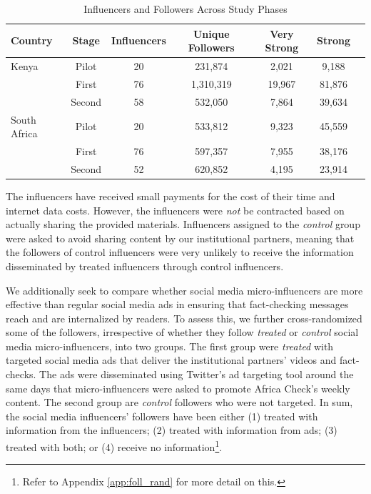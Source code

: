 \begin{table}[!htpb]
    \centering
     \caption{Influencers and Followers Across Study Phases}
    \label{tab:desc_stat}
    \begin{tabular}[t]{lcccccc}
\hline
\textbf{Country} & \textbf{Stage} & \textbf{Influencers} & \textbf{Unique Followers} & \textbf{Very Strong} & \textbf{Strong}\\
\hline
Kenya & Pilot & 20 & 231,874 & 2,021 & 9,188\\
 & First & 76 & 1,310,319 & 19,967 & 81,876 \\
 & Second & 58 & 532,050 & 7,864 & 39,634 \\
\hline
South Africa & Pilot & 20 & 533,812 & 9,323 & 45,559\\
 & First & 76 & 597,357 & 7,955 & 38,176 \\
 & Second & 52 & 620,852 & 4,195 & 23,914 \\
 \hline
\end{tabular}
\end{table}

The influencers have received small payments for the cost of their time and internet data costs. However, the influencers were \textit{not} be contracted based on actually sharing the provided materials. Influencers assigned to the \textit{control} group were asked to avoid sharing content by our institutional partners, meaning that the followers of control influencers were very unlikely to receive the information disseminated by treated influencers through control influencers. 

We additionally seek to compare whether social media micro-influencers are more effective than regular social media ads in ensuring that fact-checking messages reach and are internalized by readers. To assess this, we further cross-randomized some of the followers, irrespective of whether they follow \textit{treated} or \textit{control} social media micro-influencers, into two groups. The first group were \textit{treated} with targeted social media ads that deliver the institutional partners' videos and fact-checks. The ads were disseminated using Twitter's ad targeting tool around the same days that micro-influencers were asked to promote Africa Check's weekly content. The second group are  \textit{control} followers who were not targeted. In sum, the social media influencers' followers have been either  (1) treated with information from the influencers; (2) treated with information from ads; (3) treated with both; or (4) receive no information\footnote{Refer to Appendix \ref{app:foll_rand} for more detail on this.}. 

